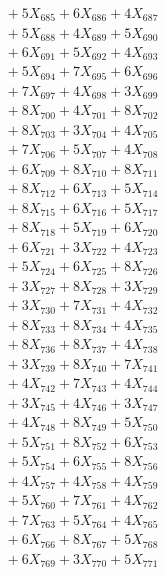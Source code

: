 \documentclass[a4paper,10pt]{article}
\begin{document}
{\begin{align}
&\;  + 5 X_{685} + 6 X_{686} + 4 X_{687} \\[0.3ex]
&\;  + 5 X_{688} + 4 X_{689} + 5 X_{690} \\[0.3ex]
&\;  + 6 X_{691} + 5 X_{692} + 4 X_{693} \\[0.3ex]
&\;  + 5 X_{694} + 7 X_{695} + 6 X_{696} \\[0.3ex]
&\;  + 7 X_{697} + 4 X_{698} + 3 X_{699} \\[0.5ex]\allowbreak
&\;  + 8 X_{700} + 4 X_{701} + 8 X_{702} \\[0.3ex]
&\;  + 8 X_{703} + 3 X_{704} + 4 X_{705} \\[0.3ex]
&\;  + 7 X_{706} + 5 X_{707} + 4 X_{708} \\[0.3ex]
&\;  + 6 X_{709} + 8 X_{710} + 8 X_{711} \\[0.3ex]
&\;  + 8 X_{712} + 6 X_{713} + 5 X_{714} \\[0.3ex]
&\;  + 8 X_{715} + 6 X_{716} + 5 X_{717} \\[0.3ex]
&\;  + 8 X_{718} + 5 X_{719} + 6 X_{720} \\[0.3ex]
&\;  + 6 X_{721} + 3 X_{722} + 4 X_{723} \\[0.3ex]
&\;  + 5 X_{724} + 6 X_{725} + 8 X_{726} \\[0.3ex]
&\;  + 3 X_{727} + 8 X_{728} + 3 X_{729} \\[0.5ex]\allowbreak
&\;  + 3 X_{730} + 7 X_{731} + 4 X_{732} \\[0.3ex]
&\;  + 8 X_{733} + 8 X_{734} + 4 X_{735} \\[0.3ex]
&\;  + 8 X_{736} + 8 X_{737} + 4 X_{738} \\[0.3ex]
&\;  + 3 X_{739} + 8 X_{740} + 7 X_{741} \\[0.3ex]
&\;  + 4 X_{742} + 7 X_{743} + 4 X_{744} \\[0.3ex]
&\;  + 3 X_{745} + 4 X_{746} + 3 X_{747} \\[0.3ex]
&\;  + 4 X_{748} + 8 X_{749} + 5 X_{750} \\[0.3ex]
&\;  + 5 X_{751} + 8 X_{752} + 6 X_{753} \\[0.3ex]
&\;  + 5 X_{754} + 6 X_{755} + 8 X_{756} \\[0.3ex]
&\;  + 4 X_{757} + 4 X_{758} + 4 X_{759} \\[0.5ex]\allowbreak
&\;  + 5 X_{760} + 7 X_{761} + 4 X_{762} \\[0.3ex]
&\;  + 7 X_{763} + 5 X_{764} + 4 X_{765} \\[0.3ex]
&\;  + 6 X_{766} + 8 X_{767} + 5 X_{768} \\[0.3ex]
&\;  + 6 X_{769} + 3 X_{770} + 5 X_{771} \\[0.3ex]

\end{align}}
\end{document}
